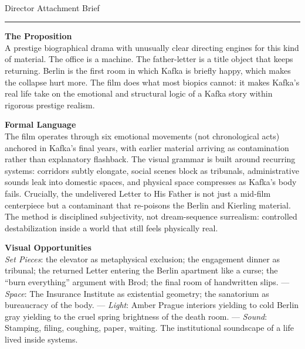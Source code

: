 \documentclass[11pt,letterpaper]{article}
\begin{document}
\begin{center}
{\Large\bfseries\sffamily \filmtitleupper}\\[3pt]
{\normalsize\sffamily\color{kafkagray} Director Attachment Brief}
\end{center}
\vspace{2pt}
\textcolor{sectionrule}{\rule{\textwidth}{0.5pt}}
\vspace{4pt}

\textbf{The Proposition}\\
A prestige biographical drama with unusually clear directing engines for this kind of material. The office is a machine. The father-letter is a title object that keeps returning. Berlin is the first room in which Kafka is briefly happy, which makes the collapse hurt more. The film does what most biopics cannot: it makes Kafka's real life take on the emotional and structural logic of a Kafka story within rigorous prestige realism.

\vspace{2pt}

\textbf{Formal Language}\\
The film operates through six emotional movements (not chronological acts) anchored in Kafka's final years, with earlier material arriving as contamination rather than explanatory flashback. The visual grammar is built around recurring systems: corridors subtly elongate, social scenes block as tribunals, administrative sounds leak into domestic spaces, and physical space compresses as Kafka's body fails. Crucially, the undelivered Letter to His Father is not just a mid-film centerpiece but a contaminant that re-poisons the Berlin and Kierling material. The method is disciplined subjectivity, not dream-sequence surrealism: controlled destabilization inside a world that still feels physically real.

\vspace{2pt}

\textbf{Visual Opportunities}\\
\textit{Set Pieces}: the elevator as metaphysical exclusion; the engagement dinner as tribunal; the returned Letter entering the Berlin apartment like a curse; the ``burn everything'' argument with Brod; the final room of handwritten slips. --- \textit{Space}: The Insurance Institute as existential geometry; the sanatorium as bureaucracy of the body. --- \textit{Light}: Amber Prague interiors yielding to cold Berlin gray yielding to the cruel spring brightness of the death room. --- \textit{Sound}: Stamping, filing, coughing, paper, waiting. The institutional soundscape of a life lived inside systems.
\end{document}
